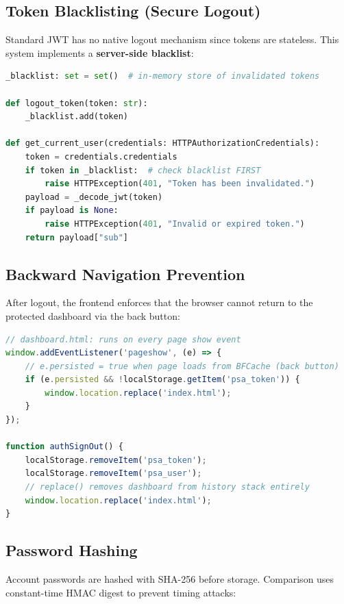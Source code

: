 \documentclass[12pt,a4paper]{article}
\begin{document}
\subsection{Token Blacklisting (Secure Logout)}

Standard JWT has no native logout mechanism since tokens are stateless.
This system implements a \textbf{server-side blacklist}:

\begin{lstlisting}[language=Python, caption={Token Blacklist for Secure Logout}]
_blacklist: set = set()  # in-memory store of invalidated tokens

def logout_token(token: str):
    _blacklist.add(token)

def get_current_user(credentials: HTTPAuthorizationCredentials):
    token = credentials.credentials
    if token in _blacklist:  # check blacklist FIRST
        raise HTTPException(401, "Token has been invalidated.")
    payload = _decode_jwt(token)
    if payload is None:
        raise HTTPException(401, "Invalid or expired token.")
    return payload["sub"]
\end{lstlisting}

\subsection{Backward Navigation Prevention}

After logout, the frontend enforces that the browser cannot return to
the protected dashboard via the back button:

\begin{lstlisting}[language=JavaScript, caption={Client-Side Session Guard}]
// dashboard.html: runs on every page show event
window.addEventListener('pageshow', (e) => {
    // e.persisted = true when page loads from BFCache (back button)
    if (e.persisted && !localStorage.getItem('psa_token')) {
        window.location.replace('index.html');
    }
});

function authSignOut() {
    localStorage.removeItem('psa_token');
    localStorage.removeItem('psa_user');
    // replace() removes dashboard from history stack entirely
    window.location.replace('index.html');
}
\end{lstlisting}

\subsection{Password Hashing}

Account passwords are hashed with SHA-256 before storage. Comparison
uses constant-time HMAC digest to prevent timing attacks:
\end{document}
